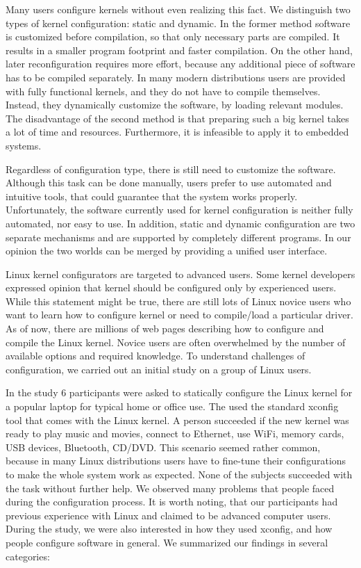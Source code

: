 \documentclass{chi2009}
\begin{document}
Many users configure kernels without even realizing this fact. We distinguish two types of kernel configuration: static and dynamic. In the former method software is customized before compilation, so that only necessary parts are compiled. It results in a smaller program footprint and faster compilation. On the other hand, later reconfiguration requires more effort, because any additional piece of software has to be compiled separately. In many modern distributions users are provided with fully functional kernels, and they do not have to compile themselves. Instead, they dynamically customize the software, by loading relevant modules. The disadvantage of the second method is that preparing such a big kernel takes a lot of time and resources. Furthermore, it is infeasible to apply it to embedded systems.

Regardless of configuration type, there is still need to customize the software. Although this task can be done manually, users prefer to use automated and intuitive tools, that could guarantee that the system works properly. Unfortunately, the software currently used for kernel configuration is neither fully automated, nor easy to use. In addition, static and dynamic configuration are two separate mechanisms and are supported by completely different programs. In our opinion the two worlds can be merged by providing a unified user interface.

Linux kernel configurators are targeted to advanced users. Some kernel developers expressed opinion \cite{kernel:aunt:2002} that kernel should be configured only by experienced users. While this statement might be true, there are still lots of Linux novice users who want to learn how to configure kernel or need to compile/load a particular driver. As of now, there are millions of web pages describing how to configure and compile the Linux kernel. Novice users are often overwhelmed by the number of available options and required knowledge. To understand challenges of configuration, we carried out an initial study on a group of Linux users.

In the study 6 participants were asked to statically configure the Linux kernel for a popular laptop for typical home or office use. The used the standard \textsf{xconfig} tool that comes with the Linux kernel. A person succeeded if the new kernel was ready to play music and movies, connect to Ethernet, use WiFi, memory cards, USB devices, Bluetooth, CD/DVD. This scenario seemed rather common, because in many Linux distributions users have to fine-tune their configurations to make the whole system work as expected. None of the subjects succeeded with the task without further help. We observed many problems that people faced during the configuration process. It is worth noting, that our participants had previous experience with Linux and claimed to be advanced computer users. During the study, we were also interested in how they used \textsf{xconfig}, and how people configure software in general. We summarized our findings in several categories:
\end{document}
